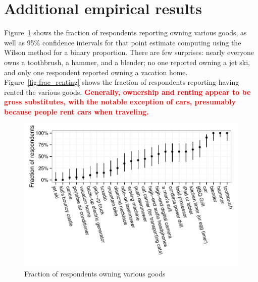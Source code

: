 \documentclass[11pt]{article}
\newcommand{\important}[1]{\textcolor{red}{\textbf{#1}}}
\newcommand{\important}[1]{#1}
\begin{document}
\section{Additional empirical results} \label{sec:additional_results}

Figure~\ref{fig:frac_owning} shows the fraction of respondents reporting owning various goods, as well as 95\% confidence intervals for that point estimate computing using the Wilson method for a binary proportion.    
There are few surprises: nearly everyone owns a toothbrush, a hammer, and a blender; no one reported owning a jet ski, and only one respondent reported owning a vacation home.
Figure~\ref{fig:frac_renting} shows the fraction of respondents reporting having rented the various goods. 
\important{Generally, ownership and renting appear to be gross substitutes, with the notable exception of cars, presumably because people rent cars when traveling.}

\begin{figure}
\centering 
\caption{Fraction of respondents owning various goods \label{fig:frac_owning} }
\begin{minipage}{0.90 \linewidth}
\includegraphics[width = \linewidth]{./plots/ownership_fractions.pdf} 
\end{minipage} 
\end{figure} 
\end{document}
